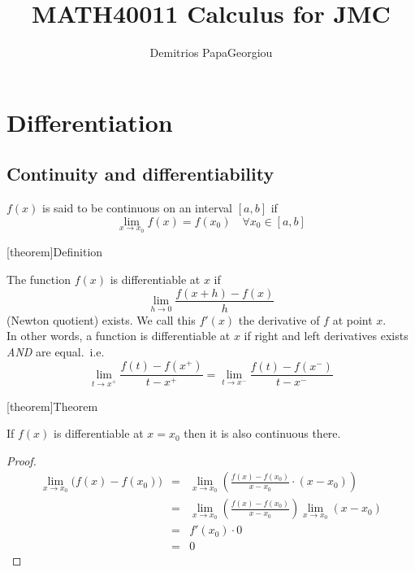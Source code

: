 \documentclass[12pt]{report}
\author{Demitrios PapaGeorgiou}
\title{MATH40011 Calculus for JMC}
\theoremstyle{definition}
\begin{document}
\maketitle
\tableofcontents

\chapter{Differentiation}

\section{Continuity and differentiability}

\begin{theorem}
    $f(x)$ is said to be continuous on an interval $[a,b]$ if \[
        \lim_{x \rightarrow x_0} f(x) = f(x_0) \quad \forall x_0 \in [a,b]
    \]
\end{theorem}

[theorem]{Definition}
\begin{differentiability}
    The function $f(x)$ is differentiable at $x$ if \[
        \lim_{h \rightarrow 0} \frac{f(x+h) - f(x)}{h}
    \] (Newton quotient) exists. We call this $f'(x)$ the derivative of $f$ at point $x$.
    \\In other words, a function is differentiable at $x$ 
    if right and left derivatives exists \emph{AND} are equal.\ i.e. \[
        \lim_{t \rightarrow x^{+}} \frac{f(t) - f(x^+)}{t - x^+} 
        = \lim_{t \rightarrow x^{-}} \frac{f(t) - f(x^-)}{t - x^-}
    \]
\end{differentiability}

[theorem]{Theorem}
\begin{differentiable means continuous}
    If $f(x)$ is differentiable at $x = x_0$ then it is also continuous there.
\end{differentiable means continuous}
\begin{proof}
    \begin{eqnarray*}
        \lim_{x \rightarrow x_0} \Big(f(x) - f(x_0)\big)
        &=& \lim_{x \rightarrow x_0} \left(\frac{f(x) - f(x_0)}{x - x_0} \cdot (x - x_0)\right) \\
        &=& \lim_{x \rightarrow x_0} \left(\frac{f(x) - f(x_0)}{x - x_0}\right) 
        \lim_{x \rightarrow x_0} (x - x_0) \\
        &=& f'(x_0) \cdot 0 \\
        &=& 0
    \end{eqnarray*}
\end{proof}
\end{document}
